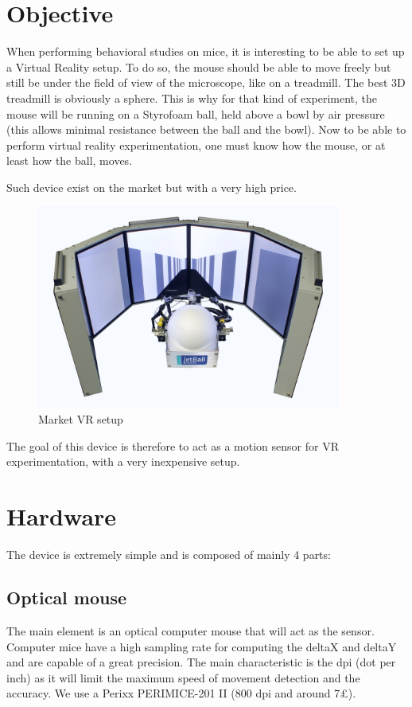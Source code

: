 \documentclass[a4paper]{article}
\begin{document}
\section{Objective}
When performing behavioral studies on mice, it is interesting to be able to set up a Virtual Reality setup. To do so, the mouse should be able to move freely but still be under the field of view of the microscope, like on a treadmill. The best 3D treadmill is obviously a sphere. 
This is why for that kind of experiment, the mouse will be running on a Styrofoam ball, held above a bowl by air pressure (this allows minimal resistance between the ball and the bowl).
Now to be able to perform virtual reality experimentation, one must know how the mouse, or at least how the ball, moves.

Such device exist on the market but with a very high price.

\begin{figure}[h!]
    \centering
    \includegraphics[width = 10cm]{images/VR.jpg}
    \caption{Market VR setup}
    \label{fig:vr}
\end{figure}


The goal of this device is therefore to act as a motion sensor for VR experimentation, with a very inexpensive setup.

\section{Hardware}
The device is extremely simple and is composed of mainly 4 parts:
\subsection{Optical mouse}
The main element is an optical computer mouse that will act as the sensor.
Computer mice have a high sampling rate for computing the deltaX and deltaY and are capable of a great precision.
The main characteristic is the dpi (dot per inch) as it will limit the maximum speed of movement detection and the accuracy. 
We use a Perixx PERIMICE-201 II (800 dpi and around 7£).
\end{document}
